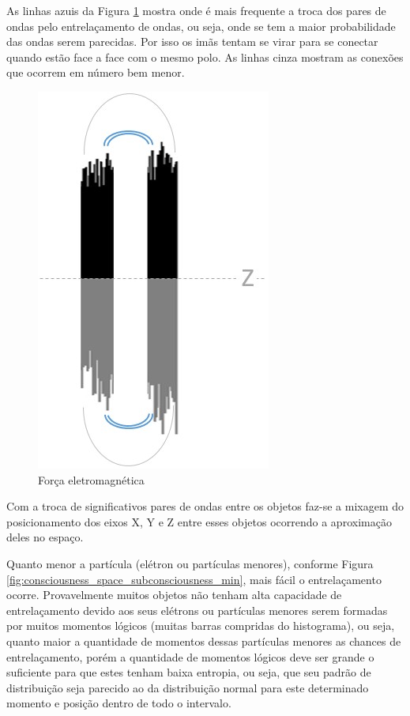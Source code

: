 As linhas azuis da Figura \ref{fig:consciousness_electromaagnetic_force} mostra onde é mais frequente a troca dos pares de ondas pelo entrelaçamento de ondas, ou seja, onde se tem a maior probabilidade das ondas serem parecidas. Por isso os imãs tentam se virar para se conectar quando estão face a face com o mesmo polo. As linhas cinza mostram as conexões que ocorrem em número bem menor. 
	\begin{figure}[H]
	\caption{Força eletromagnética}
	\label{fig:consciousness_electromaagnetic_force}
	\centering
	\includegraphics[scale=.7]{sections/images/consciousness_electromaagnetic_force.jpg}
	\end{figure}

Com a troca de significativos pares de ondas entre os objetos faz-se a mixagem do posicionamento dos eixos X, Y e Z entre esses objetos ocorrendo a aproximação deles no espaço. 

Quanto menor a partícula (elétron ou partículas menores), conforme Figura \ref{fig:consciousness_space_subconsciousness_min}, mais fácil o entrelaçamento ocorre. Provavelmente muitos objetos não tenham alta capacidade de entrelaçamento devido aos seus elétrons ou partículas menores serem formadas por muitos momentos lógicos (muitas barras compridas do histograma), ou seja, quanto maior a quantidade de momentos dessas partículas menores as chances de entrelaçamento, porém a quantidade de momentos lógicos deve ser grande o suficiente para que estes tenham baixa entropia, ou seja, que seu padrão de distribuição seja parecido ao da distribuição normal para este determinado momento e posição dentro de todo o intervalo. 

